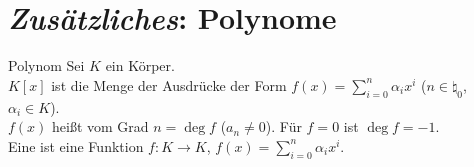 \section{%
    \emph{Zusätzliches}: Polynome%
}

\begin{Def}{Polynom}
    Sei $K$ ein Körper. \\
    $K[x]$ ist die Menge der Ausdrücke der Form
    $f(x) = \sum_{i=0}^n \alpha_i x^i$ ($n \in \natural_0$,
    $\alpha_i \in K$). \\
    $f(x)$ heißt  vom Grad $n = \deg f$ ($a_n \not= 0$).
    Für $f = 0$ ist $\deg f = -1$. \\
    Eine  ist eine Funktion
    $f: K \rightarrow K$, $f(x) = \sum_{i = 0}^n \alpha_i x^i$.
\end{Def}

\pagebreak
